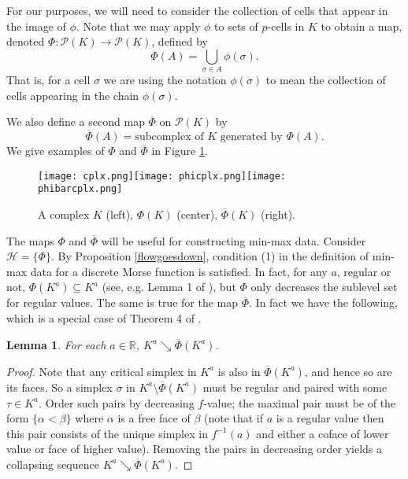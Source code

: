 \documentclass[11pt]{amsart}
\newtheorem{lemma}[theorem]{Lemma}
\theoremstyle{definition}
\newcommand{\zr}{{\mathbb R}}
\begin{document}
For our purposes, we will need to consider the collection of cells that appear in the image of $\phi$. Note that we may apply ${\phi}$ to sets of $p$-cells in $K$ to obtain a map, denoted ${\Phi}: {\mathcal P}(K)\to {\mathcal P}(K)$, defined by $$\Phi(A) = \bigcup_{\sigma\in A} \phi(\sigma).$$ That is, for a cell $\sigma$ we are using the notation $\phi(\sigma)$ to mean the collection of cells appearing in the chain $\phi(\sigma)$.

We also define a second map $\overline{\Phi}$ on ${\mathcal P}(K)$ by $$\overline{\Phi}(A) = \text{subcomplex of $K$ generated by $\Phi(A)$}.$$ We give examples of $\Phi$ and $\overline{\Phi}$ in Figure \ref{phiexamples}.

\begin{figure}
    \centering
    \texttt{[image: cplx.png]}\texttt{[image: phicplx.png]}\texttt{[image: phibarcplx.png]}
    \caption{A complex $K$ (left), $\Phi(K)$ (center), $\overline{\Phi}(K)$ (right).}
    \label{phiexamples}
\end{figure}

The maps $\Phi$ and $\overline{\Phi}$ will be useful for constructing min-max data.  Consider $\mathcal{H} = \{ {\Phi} \}$. By Proposition \ref{flowgoesdown}, condition (1) in the definition of min-max data for a discrete Morse function is satisfied.  In fact, for any $a$, regular or not, ${\Phi}(K^a)\subseteq K^a$ (see, e.g. Lemma 1 of \cite{robins}), but ${\Phi}$ only decreases the sublevel set for regular values. The same is true for the map $\overline{\Phi}$. In fact we have the following, which is a special case of Theorem 4 of \cite{robins}.

\begin{lemma}\label{barphicollapse} For each $a\in\zr$, $K^a\searrow \overline{\Phi}(K^a)$.
\end{lemma}

\begin{proof}
Note that any critical simplex in $K^a$ is also in $\overline{\Phi}(K^a)$, and hence so are its faces. So a simplex $\sigma$ in $K^a\setminus\overline{\Phi}(K^a)$ must be regular and paired with some $\tau\in K^a$. Order such pairs by decreasing $f$-value; the maximal pair must be of the form $\{\alpha<\beta\}$ where $\alpha$ is a free face of $\beta$ (note that if $a$ is a regular value then this pair consists of the unique simplex in $f^{-1}(a)$ and either a coface of lower value or face of higher value). Removing the pairs in decreasing order yields a collapsing sequence $K^a\searrow \overline{\Phi}(K^a)$.
\end{proof}
\end{document}
